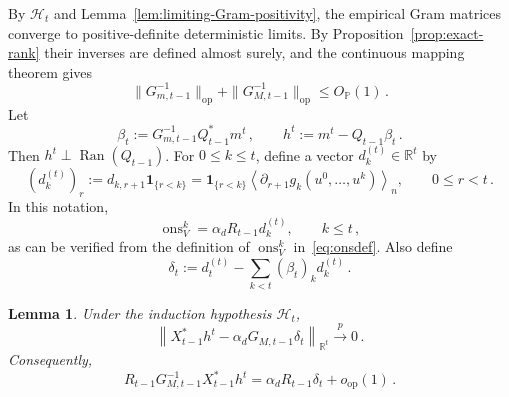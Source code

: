 \documentclass[11pt]{article}
\newtheorem{lemma}[theorem]{Lemma}
\theoremstyle{definition}
\theoremstyle{remark}
\numberwithin{equation}{section}
\numberwithin{theorem}{section}
\newcommand{\R}{\mathbb R}
\newcommand{\Prob}{\mathbb P}
\newcommand{\op}{\mathrm{op}}
\newcommand{\norm}[1]{\left\lVert #1\right\rVert}
\newcommand{\ons}{\operatorname{ons}}
\newcommand{\xto}{\xrightarrow}
\newcommand{\ind}{\mathbf 1}
\begin{document}
By $\mathcal{H}_{t}$ and Lemma~\ref{lem:limiting-Gram-positivity},
the empirical Gram matrices
converge to positive-definite deterministic limits. By Proposition~\ref{prop:exact-rank} their
 inverses are defined almost surely, and the continuous mapping
theorem gives
\[
  \|G_{m,t-1}^{-1}\|_{\op}
  +\|G_{M,t-1}^{-1}\|_{\op}
  \le O_{\Prob}(1)\,.
\]  
%
Let
\begin{equation}\label{eq:beta-h-def}
  \beta_t:=G_{m,t-1}^{-1}Q_{t-1}^*m^t\,,
  \qquad
  h^t:=m^t-Q_{t-1}\beta_t\,.
\end{equation}
Then $h^t\perp\operatorname{Ran}(Q_{t-1})$.  For $0\le k\le t$, define a vector $d_k^{(t)}\in\R^{t}$ by
\begin{equation}\label{eq:derivative-vectors}
  (d_k^{(t)})_r
  :=d_{k,r+1}\ind_{\{r<k\}} = \ind_{\{r<k\}}
  \left\langle\partial_{r+1}g_k(u^0,\ldots,u^k)\right\rangle_n,
  \qquad 0\le r<t\,.
\end{equation}
  In this notation,
\begin{equation}\label{eq:onsv-matrix-notation}
  \ons_V^k=\alpha_dR_{t-1}d_k^{(t)},
  \qquad k\le t\,,
\end{equation}
as can be verified from the definition of $\ons_V^k$ in~\eqref{eq:onsdef}. 
Also define
\begin{equation}\label{eq:delta-t-def}
  \delta_t:=d_t^{(t)}-\sum_{k<t}(\beta_t)_k d_k^{(t)}\,.
\end{equation}
 

\begin{lemma}\label{lem:matrix-side-regression}
Under the induction hypothesis $\mathcal{H}_{t}$,
\begin{equation}\label{eq:matrix-side-regression}
  \norm{X_{t-1}^*h^t-\alpha_dG_{M,t-1}\delta_t}_{\R^t}
  \xto{p} 0 \,.
\end{equation}
Consequently,
\begin{equation}\label{eq:matrix-side-regression-after-inverse}
  R_{t-1}G_{M,t-1}^{-1}X_{t-1}^*h^t
  =\alpha_dR_{t-1}\delta_t+o_{\op}(1)\,.
\end{equation}
\end{lemma}
\end{document}
